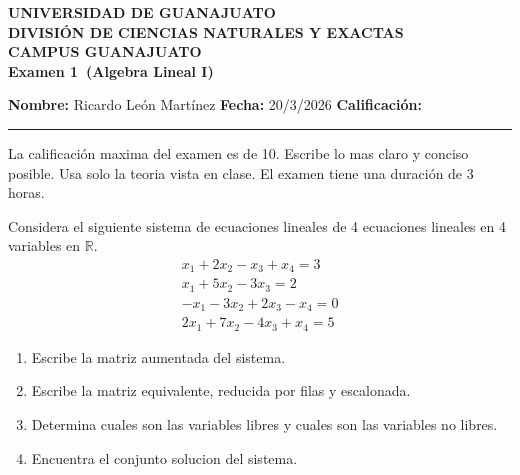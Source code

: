 \documentclass[12pt,a4paper]{article}
\newcommand{\alumno}{Ricardo León Martínez}
\newcommand{\materia}{Algebra Lineal I}
\newcommand{\tarea}{Examen 1}
\newcommand{\fecha}{20/3/2026}
\begin{document}
    \begin{center}
        {\large\textbf{UNIVERSIDAD DE GUANAJUATO}}\\[0.3cm]
        {\normalsize\textbf{DIVISIÓN DE CIENCIAS NATURALES Y EXACTAS}}\\
        {\normalsize\textbf{CAMPUS GUANAJUATO}}\\[1cm]

        {\Large\textbf{\tarea\ (\materia)}}\\[1cm]
    \end{center}

    \noindent
    \textbf{Nombre:} \alumno 
    \hfill 
    \textbf{Fecha:} \fecha 
    \hfill 
    \textbf{Calificación:} \rule{3cm}{0.4pt}

    \vspace{0.3cm}

    La calificación maxima del examen es de 10. Escribe lo mas claro y conciso posible.
    Usa solo la teoria vista en clase. El examen tiene una duración de 3 horas.

    \begin{mdframed}[style=mdbluebox,frametitle={Ejercicio 1}]
        Considera el siguiente sistema de ecuaciones lineales de 4
        ecuaciones lineales en 4 variables en $\mathbb{R}$.
        \begin{equation*}
            \begin{matrix}
                x_{1}+2x_{2}-x_{3}+x_{4}=3\\
                x_{1}+5x_{2}-3x_{3}=2\\
                -x_{1}-3x_{2}+2x_{3}-x_{4}=0\\
                2x_{1}+7x_{2}-4x_{3}+x_{4}=5
            \end{matrix}
        \end{equation*}
        \begin{enumerate}
            \item[(a)] Escribe la matriz aumentada del sistema.
            \item[(b)] Escribe la matriz equivalente, reducida por filas y escalonada.
            \item[(c)] Determina cuales son las variables libres y cuales son las variables no libres.
            \item[(d)] Encuentra el conjunto solucion del sistema.  
        \end{enumerate}
    \end{mdframed}
\end{document}

